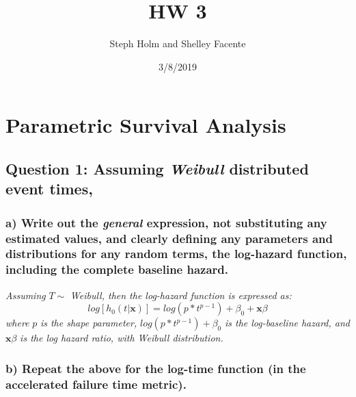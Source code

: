 \documentclass[]{article}
\title{HW 3}
\author{Steph Holm and Shelley Facente}
\date{3/8/2019}
\begin{document}
\maketitle

\section{Parametric Survival
Analysis}\label{parametric-survival-analysis}

\subsection{\texorpdfstring{Question 1: Assuming \emph{Weibull}
distributed event
times,}{Question 1: Assuming Weibull distributed event times,}}\label{question-1-assuming-weibull-distributed-event-times}

\subsubsection{\texorpdfstring{a) Write out the \emph{general}
expression, not substituting any estimated values, and clearly defining
any parameters and distributions for any random terms, the
\textbf{log-hazard function}, including the complete baseline
hazard.}{a) Write out the general expression, not substituting any estimated values, and clearly defining any parameters and distributions for any random terms, the log-hazard function, including the complete baseline hazard.}}\label{a-write-out-the-general-expression-not-substituting-any-estimated-values-and-clearly-defining-any-parameters-and-distributions-for-any-random-terms-the-log-hazard-function-including-the-complete-baseline-hazard.}

\emph{Assuming} \(T \sim\) \emph{Weibull, then the log-hazard function
is expressed as:} \[
log[h_0(t|\boldsymbol{x})] = log(p * t^{p-1}) + \beta_0 +\boldsymbol{x}\beta
\] \emph{where} \(p\) \emph{is the shape parameter,}
\(log(p * t^{p-1}) + \beta_0\) \emph{is the log-baseline hazard, and}
\(\boldsymbol{x}\beta\) \emph{is the log hazard ratio, with Weibull
distribution.}

\vspace{6pt}

\subsubsection{\texorpdfstring{b) Repeat the above for the
\textbf{log-time function} (in the accelerated failure time
metric).}{b) Repeat the above for the log-time function (in the accelerated failure time metric).}}\label{b-repeat-the-above-for-the-log-time-function-in-the-accelerated-failure-time-metric.}
\end{document}
